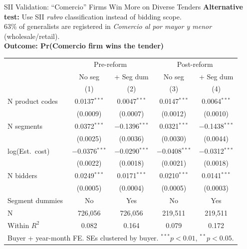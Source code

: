 \documentclass[9pt,aspectratio=169]{beamer}
\begin{document}
\begin{frame}{SII Validation: ``Comercio'' Firms Win More on Diverse Tenders}
\textbf{Alternative test:} Use SII \textit{rubro} classification instead of bidding scope.\\
63\% of generalists are registered in \textit{Comercio al por mayor y menor} (wholesale/retail). \\[6pt]
\textbf{Outcome: Pr(Comercio firm wins the tender)}

\centering\small
\begin{tabular}{lcccc}
\toprule
 & \multicolumn{2}{c}{Pre-reform} & \multicolumn{2}{c}{Post-reform} \\
 & No seg & + Seg dum & No seg & + Seg dum \\
 & (1) & (2) & (3) & (4) \\
\midrule
N product codes & 0.0137$^{***}$ & 0.0047$^{***}$ & 0.0147$^{***}$ & 0.0064$^{***}$ \\
 & (0.0009) & (0.0007) & (0.0012) & (0.0010) \\[2pt]
N segments & 0.0372$^{***}$ & $-$0.1396$^{***}$ & 0.0321$^{***}$ & $-$0.1438$^{***}$ \\
 & (0.0025) & (0.0036) & (0.0030) & (0.0044) \\[2pt]
log(Est.\ cost) & $-$0.0376$^{***}$ & $-$0.0290$^{***}$ & $-$0.0408$^{***}$ & $-$0.0312$^{***}$ \\
 & (0.0022) & (0.0018) & (0.0021) & (0.0018) \\[2pt]
N bidders & 0.0249$^{***}$ & 0.0171$^{***}$ & 0.0210$^{***}$ & 0.0141$^{***}$ \\
 & (0.0005) & (0.0004) & (0.0005) & (0.0003) \\[2pt]
\midrule
Segment dummies & No & Yes & No & Yes \\
N & 726,056 & 726,056 & 219,511 & 219,511 \\
Within $R^2$ & 0.082 & 0.164 & 0.079 & 0.172 \\
\bottomrule
\multicolumn{5}{l}{\footnotesize Buyer + year-month FE. SEs clustered by buyer. $^{***}p<0.01$, $^{**}p<0.05$.} \\
\end{tabular}
\end{frame}
\end{document}
